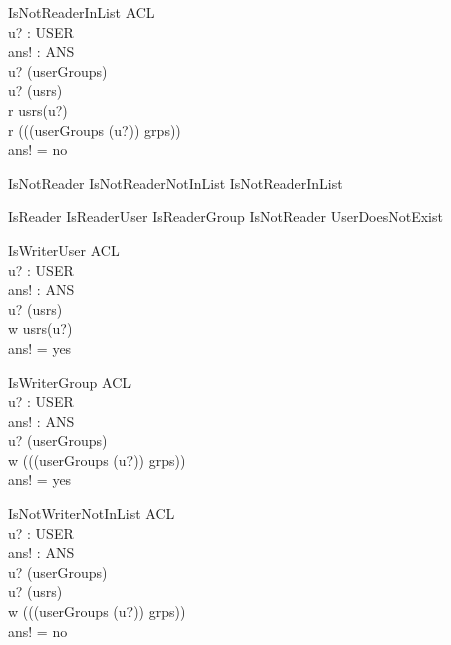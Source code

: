 \begin{schema}{IsNotReaderInList} 
\Xi ACL \\
u? : USER \\
ans! : ANS \\
\where 
u? \in \dom (userGroups) \\ 
u? \in \dom (usrs) \\
r \notin usrs(u?) \\
r \notin \bigcup (\ran((userGroups (u?)) \dres grps)) \\
ans! = no
\end{schema}

\begin{zed}
IsNotReader  IsNotReaderNotInList \lor IsNotReaderInList\\
\end{zed}
\begin{zed}
IsReader  IsReaderUser \lor IsReaderGroup \lor IsNotReader \lor UserDoesNotExist
\end{zed}

\begin{schema}{IsWriterUser}
\Xi ACL \\
u? : USER \\
ans! : ANS \\
\where
u? \in \dom (usrs) \\ 
w \in usrs(u?) \\
ans! = yes
\end{schema}

\begin{schema}{IsWriterGroup}
\Xi ACL \\
u? : USER \\
ans! : ANS \\
\where
u? \in \dom (userGroups) \\ 
w \in \bigcup (\ran((userGroups (u?)) \dres grps)) \\
ans! = yes
\end{schema}

\begin{schema}{IsNotWriterNotInList} 
\Xi ACL \\
u? : USER \\
ans! : ANS \\
\where 
u? \in \dom (userGroups) \\ 
u? \notin \dom (usrs) \\
w \notin \bigcup (\ran((userGroups (u?)) \dres grps)) \\
ans! = no
\end{schema}

